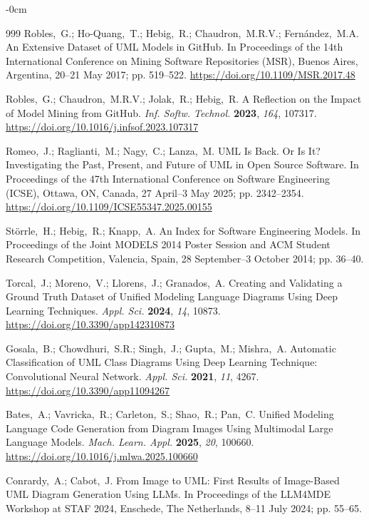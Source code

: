 \documentclass[data,datadescriptor,submit,pdftex,moreauthors]{Definitions/mdpi}
\begin{document}
\begin{adjustwidth}{-\extralength}{0cm}
\begin{thebibliography}{999}
Robles,~G.; Ho-Quang,~T.; Hebig,~R.; Chaudron,~M.R.V.; Fern\'{a}ndez,~M.A. An Extensive Dataset of UML Models in GitHub. In Proceedings of the 14th International Conference on Mining Software Repositories (MSR), Buenos Aires, Argentina, 20--21 May 2017; pp. 519--522. \url{https://doi.org/10.1109/MSR.2017.48}

Robles,~G.; Chaudron,~M.R.V.; Jolak,~R.; Hebig,~R. A Reflection on the Impact of Model Mining from GitHub. {\em Inf. Softw. Technol.} {\bf 2023}, {\em 164}, 107317. \url{https://doi.org/10.1016/j.infsof.2023.107317}

Romeo,~J.; Raglianti,~M.; Nagy,~C.; Lanza,~M. UML Is Back. Or Is It? Investigating the Past, Present, and Future of UML in Open Source Software. In Proceedings of the 47th International Conference on Software Engineering (ICSE), Ottawa, ON, Canada, 27 April--3 May 2025; pp. 2342--2354. \url{https://doi.org/10.1109/ICSE55347.2025.00155}

St\"{o}rrle,~H.; Hebig,~R.; Knapp,~A. An Index for Software Engineering Models. In Proceedings of the Joint MODELS 2014 Poster Session and ACM Student Research Competition, Valencia, Spain, 28 September--3 October 2014; pp. 36--40.

Torcal,~J.; Moreno,~V.; Llorens,~J.; Granados,~A. Creating and Validating a Ground Truth Dataset of Unified Modeling Language Diagrams Using Deep Learning Techniques. {\em Appl. Sci.} {\bf 2024}, {\em 14}, 10873. \url{https://doi.org/10.3390/app142310873}

Gosala,~B.; Chowdhuri,~S.R.; Singh,~J.; Gupta,~M.; Mishra,~A. Automatic Classification of UML Class Diagrams Using Deep Learning Technique: Convolutional Neural Network. {\em Appl. Sci.} {\bf 2021}, {\em 11}, 4267. \url{https://doi.org/10.3390/app11094267}

Bates,~A.; Vavricka,~R.; Carleton,~S.; Shao,~R.; Pan,~C. Unified Modeling Language Code Generation from Diagram Images Using Multimodal Large Language Models. {\em Mach. Learn. Appl.} {\bf 2025}, {\em 20}, 100660. \url{https://doi.org/10.1016/j.mlwa.2025.100660}

Conrardy,~A.; Cabot,~J. From Image to UML: First Results of Image-Based UML Diagram Generation Using LLMs. In Proceedings of the LLM4MDE Workshop at STAF 2024, Enschede, The Netherlands, 8--11 July 2024; pp. 55--65.


\end{thebibliography}
\end{adjustwidth}
\end{document}
